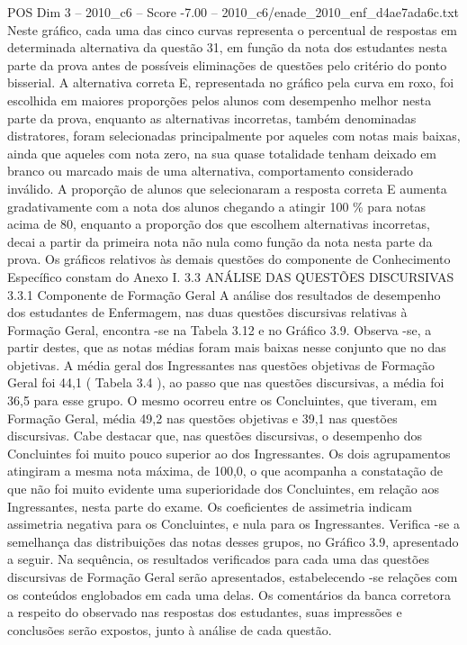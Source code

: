 \begin{textsample}{POS Dim 3 – 2010\_c6 – Score -7.00 – 2010\_c6/enade\_2010\_enf\_d4ae7ada6c.txt}
Neste gráfico, cada uma das cinco curvas representa o percentual de respostas em determinada alternativa da questão 31, em função da nota dos estudantes nesta parte da prova antes de possíveis eliminações de questões pelo critério do ponto bisserial.
A alternativa correta E, representada no gráfico pela curva em roxo, foi escolhida em maiores proporções pelos alunos com desempenho melhor nesta parte da prova, enquanto as alternativas incorretas, também denominadas distratores, foram selecionadas principalmente por aqueles com notas mais baixas, ainda que aqueles com nota zero, na sua quase totalidade tenham deixado em branco ou marcado mais de uma alternativa, comportamento considerado inválido.
A proporção de alunos que selecionaram a resposta correta E aumenta gradativamente com a nota dos alunos chegando a atingir 100 \% para notas acima de 80, enquanto a proporção dos que escolhem alternativas incorretas, decai a partir da primeira nota não nula como função da nota nesta parte da prova.
Os gráficos relativos às demais questões do componente de Conhecimento Específico constam do Anexo I. 3.3 ANÁLISE DAS QUESTÕES DISCURSIVAS 3.3.1 Componente de Formação Geral A análise dos resultados de desempenho dos estudantes de Enfermagem, nas duas questões discursivas relativas à Formação Geral, encontra -se na Tabela 3.12 e no Gráfico 3.9.
Observa -se, a partir destes, que as notas médias foram mais baixas nesse conjunto que no das objetivas.
A média geral dos Ingressantes nas questões objetivas de Formação Geral foi 44,1 ( Tabela 3.4 ), ao passo que nas questões discursivas, a média foi 36,5 para esse grupo.
O mesmo ocorreu entre os Concluintes, que tiveram, em Formação Geral, média 49,2 nas questões objetivas e 39,1 nas questões discursivas.
Cabe destacar que, nas questões discursivas, o desempenho dos Concluintes foi muito pouco superior ao dos Ingressantes.
Os dois agrupamentos atingiram a mesma nota máxima, de 100,0, o que acompanha a constatação de que não foi muito evidente uma superioridade dos Concluintes, em relação aos Ingressantes, nesta parte do exame.
Os coeficientes de assimetria indicam assimetria negativa para os Concluintes, e nula para os Ingressantes.
Verifica -se a semelhança das distribuições das notas desses grupos, no Gráfico 3.9, apresentado a seguir.
Na sequência, os resultados verificados para cada uma das questões discursivas de Formação Geral serão apresentados, estabelecendo -se relações com os conteúdos englobados em cada uma delas.
Os comentários da banca corretora a respeito do observado nas respostas dos estudantes, suas impressões e conclusões serão expostos, junto à análise de cada questão.

\end{textsample}
